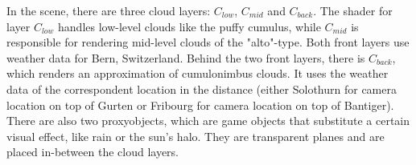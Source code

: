 \begin{figure}[H]
    \centering
    \label{img:tikz:techimpl:anatomy}
\end{figure}

\noindent
In the scene, there are three cloud layers: \color{red}$C_{low}$\color{black}, \color{red}$C_{mid}$ \color{black} and \color{red}$C_{back}$\color{black}.
The \gls{shader} for layer \color{red}$C_{low}$ \color{black} handles low-level clouds like the puffy cumulus, while \color{red}$C_{mid}$ \color{black} is responsible for rendering mid-level clouds of the "alto"-type.
Both front layers use weather data for Bern, Switzerland.
Behind the two front layers, there is \color{red}$C_{back}$\color{black}, which renders an approximation of cumulonimbus clouds. It uses the weather data of the correspondent location in the distance (either Solothurn for camera location on top of Gurten or Fribourg for camera location on top of Bantiger).
\emptyline
There are also two \gls{proxyobject}s, which are game objects that substitute a certain visual effect, like rain or the sun's halo.
They are transparent planes and are placed in-between the cloud layers.

\clearpage

